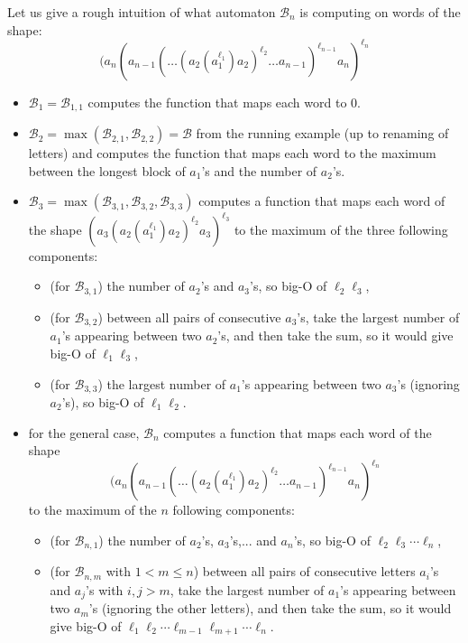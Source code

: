 \documentclass{lmcs}
\theoremstyle{remark}
\theoremstyle{remark}
\begin{document}
Let us give a rough intuition of what automaton $\mathcal{B}_n$ is computing on words of the shape: 
$$(a_n(a_{n-1}(\ldots (a_2(a_1^{\ell_1})a_2)^{\ell_2} \ldots a_{n-1})^{\ell_{n-1}}a_n)^{\ell_n}$$
\begin{itemize}
\item $\mathcal{B}_1 = \mathcal{B}_{1,1}$ computes the function that maps each word to $0$.
\item $\mathcal{B}_2 = \max(\mathcal{B}_{2,1}, \mathcal{B}_{2,2}) = \mathcal{B}$ from the running example (up to renaming of letters) and computes the function that maps each word to the maximum between the longest block of $a_1$'s and the number of $a_2$'s.
\item $\mathcal{B}_3 = \max(\mathcal{B}_{3,1}, \mathcal{B}_{3,2}, \mathcal{B}_{3,3})$ computes a function that maps each word of the shape $(a_3(a_2(a_1^{\ell_1})a_2)^{\ell_2}a_3)^{\ell_3}$ 
to the maximum of the three following components:
\begin{itemize}
    \item (for $\mathcal{B}_{3,1}$) the number of $a_2$'s and $a_3$'s, so big-O of $\ell_2\ell_3$,
    \item (for $\mathcal{B}_{3,2}$) between all pairs of consecutive $a_3$'s, take the largest number of $a_1$'s appearing between two $a_2$'s, and then take the sum, so it would give big-O of $\ell_1\ell_3$,
    \item (for $\mathcal{B}_{3,3}$) the largest number of $a_1$'s appearing between two $a_3$'s (ignoring $a_2$'s), so big-O of $\ell_1\ell_2$.
\end{itemize}
\item for the general case, $\mathcal{B}_n$ computes a function that maps each word of the shape 
$$(a_n(a_{n-1}(\ldots (a_2(a_1^{\ell_1})a_2)^{\ell_2} \ldots a_{n-1})^{\ell_{n-1}}a_n)^{\ell_n}$$ 
to the maximum of the $n$ following components:
\begin{itemize}
    \item (for $\mathcal{B}_{n,1}$) the number of $a_2$'s, $a_3$'s,... and $a_n$'s, so big-O of $\ell_2\ell_3 \dotsm \ell_n$,
    \item (for $\mathcal{B}_{n,m}$ with $1<m\leq n$) between all pairs of consecutive letters $a_i$'s and $a_j$'s with $i,j > m$, take the largest number of $a_1$'s appearing between two $a_m$'s (ignoring the other letters), and then take the sum, so it would give big-O of $\ell_1\ell_2 \dotsm \ell_{m-1}\ell_{m+1}\dotsm\ell_{n}$.
\end{itemize}
\end{itemize}
\end{document}
